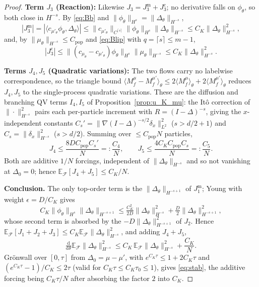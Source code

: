 \documentclass[a4paper,fleqn]{cas-sc}
\theoremstyle{definition}
\theoremstyle{remark}
\begin{document}
\begin{proof}
\textbf{Term $J_3$ (Reaction):} Likewise $J_3=J_3^{\mathrm m}+J_3^{\mathrm c}$; no
derivative falls on $\phi_\theta$, so both close in $H^{-s}$. By \eqref{eq:Bb} and
$\|\phi_\theta\|_{H^s}=\|\Delta_\theta\|_{H^{-s}}$,
\[
|J_3^{\mathrm m}|=|\langle c_{\mu'_\theta}\phi_\theta,\Delta_\theta\rangle|
\le\|c_{\mu'_\theta}\|_{C^{\lceil s\rceil}}\|\phi_\theta\|_{H^s}\|\Delta_\theta\|_{H^{-s}}
\le C_K\|\Delta_\theta\|_{H^{-s}}^2 ,
\]
and, by $\|\mu_\theta\|_{H^{-s}}\le C_{\mathrm{pop}}$ and \eqref{eq:Blip} with
$q=\lceil s\rceil\le m-1$,
\[
|J_3^{\mathrm c}|
\le\|(c_{\mu_\theta}-c_{\mu'_\theta})\phi_\theta\|_{H^s}\|\mu_\theta\|_{H^{-s}}
\le C_K\|\Delta_\theta\|_{H^{-s}}^2 .
\]

\textbf{Terms $J_4,J_5$ (Quadratic variations):} The two flows carry no labelwise
correspondence, so the triangle bound
$\langle M^\mu_f-M^{\mu'}_f\rangle_\theta\le2\langle M^\mu_f\rangle_\theta
+2\langle M^{\mu'}_f\rangle_\theta$ reduces $J_4,J_5$ to the single-process quadratic
variations. These are the diffusion and branching QV terms $I_4,I_5$ of
Proposition~\ref{prop:u_K_mu}: the It\^o correction of $\|\cdot\|_{H^{-s}}^2$ pairs each
per-particle increment with $R=(I-\Delta)^{-s}$, giving the $x$-independent constants
$C_s'=\|\nabla(I-\Delta)^{-s/2}\delta_x\|_{L^2}^2$ ($s>d/2+1$) and
$C_s=\|\delta_x\|_{H^{-s}}^2$ ($s>d/2$). Summing over $\le C_{\mathrm{pop}}N$ particles,
\[
J_4\le\frac{8DC_{\mathrm{pop}}C_s'}{N}=:\frac{C_4}{N},
\qquad
J_5\le\frac{4C_KC_{\mathrm{pop}}C_s}{N}=:\frac{C_5}{N} .
\]
Both are additive $1/N$ forcings, independent of $\|\Delta_\theta\|_{H^{-s}}$ and so not
vanishing at $\Delta_0=0$; hence $\mathbb E_{\mathcal F}[J_4+J_5]\le C_K/N$.

\textbf{Conclusion.} The only top-order term is the $\|\Delta_\theta\|_{H^{-s+1}}$ of
$J_1^{\mathrm m}$; Young with weight $\epsilon=D/C_K$ gives
\[
C_K\|\phi_\theta\|_{H^s}\|\Delta_\theta\|_{H^{-s+1}}
\le\tfrac{C_K^2}{2D}\|\Delta_\theta\|_{H^{-s}}^2+\tfrac{D}{2}\|\Delta_\theta\|_{H^{-s+1}}^2,
\]
whose second term is absorbed by the $-D\|\Delta_\theta\|_{H^{-s+1}}^2$ of $J_2$. Hence
$\mathbb E_{\mathcal F}[J_1+J_2+J_3]\le C_K\mathbb E_{\mathcal F}\|\Delta_\theta\|_{H^{-s}}^2$,
and adding $J_4+J_5$,
\[
\tfrac{\mathrm d}{\mathrm d\theta}\mathbb E_{\mathcal F}\|\Delta_\theta\|_{H^{-s}}^2
\le C_K\,\mathbb E_{\mathcal F}\|\Delta_\theta\|_{H^{-s}}^2+\frac{C_K}{N} .
\]
Gr\"onwall over $[0,\tau]$ from $\Delta_0=\mu-\mu'$, with $e^{C_K\tau}\le1+2C_K\tau$ and
$(e^{C_K\tau}-1)/C_K\le2\tau$ (valid for $C_K\tau\le C_K\tau_0\le1$), gives
\eqref{eq:stab}, the additive forcing being $C_K\tau/N$ after absorbing the factor $2$
into $C_K$.
\end{proof}
\end{document}
